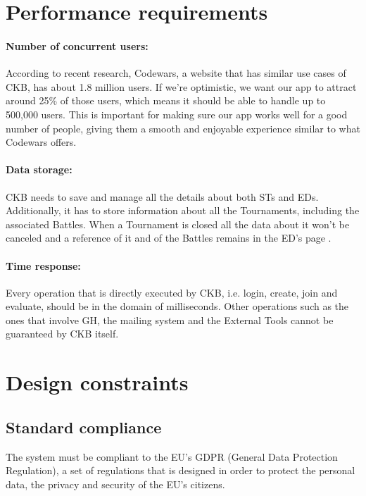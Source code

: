 \section{Performance requirements}
\label{sec:performance_requirements}%
\paragraph{Number of concurrent users:} According to recent research, Codewars, a website that has similar use cases of CKB, has about 1.8 million users. If we're optimistic, we want our app to attract around 25\% of those users, which means it should be able to handle up to 500,000 users. This is important for making sure our app works well for a good number of people, giving them a smooth and enjoyable experience similar to what Codewars offers.
\paragraph{Data storage:} CKB needs to save and manage all the details about both STs and EDs. Additionally, it has to store information about all the Tournaments, including the associated Battles. When a Tournament is closed all the data about it won’t be canceled and a reference of it and of the Battles remains in the ED’s page .
\paragraph{Time response:} Every operation that is directly executed by CKB, i.e. login, create, join and evaluate, should be in the domain of milliseconds. Other operations such as the ones that involve GH, the mailing system and the External Tools cannot be guaranteed by CKB itself.



\section{Design constraints}
\label{sec:design_constraints}%


\subsection{Standard compliance}
\label{subsec:standard compliance}%
The system must be compliant to the EU's GDPR (General Data Protection Regulation), a set of regulations that is designed in order to protect the personal data, the privacy and security of the EU's citizens. 


